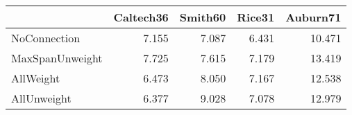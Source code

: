 \begin{tabular}{lrrrr}
\toprule
{} & Caltech36 & Smith60 & Rice31 & Auburn71 \\
\midrule
NoConnection    &     7.155 &   7.087 &  6.431 &   10.471 \\
MaxSpanUnweight &     7.725 &   7.615 &  7.179 &   13.419 \\
AllWeight       &     6.473 &   8.050 &  7.167 &   12.538 \\
AllUnweight     &     6.377 &   9.028 &  7.078 &   12.979 \\
\bottomrule
\end{tabular}
